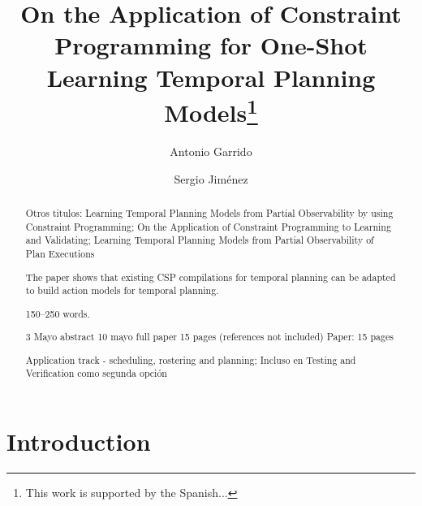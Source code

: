 \documentclass[runningheads]{llncs}
\begin{document}
\title{On the Application of Constraint Programming for One-Shot Learning Temporal Planning Models\thanks{This work is supported by the Spanish...}}


%
\author{Antonio Garrido \and Sergio Jim\'enez}

%

\maketitle              %

\begin{abstract}
Otros titulos:  Learning Temporal Planning Models from Partial Observability by using Constraint Programming; On the Application of Constraint Programming to Learning and Validating;
Learning Temporal Planning Models from Partial Observability of Plan Executions

The paper shows that existing CSP compilations for temporal planning can be adapted to build action models for temporal planning.


150--250 words.

3 Mayo abstract
10 mayo full paper 15 pages (references not included)
Paper: 15 pages

Application track - scheduling, rostering and planning;
Incluso en Testing and Verification como segunda opción

\end{abstract}


\section{Introduction}
\label{sec:introduction}
\end{document}
